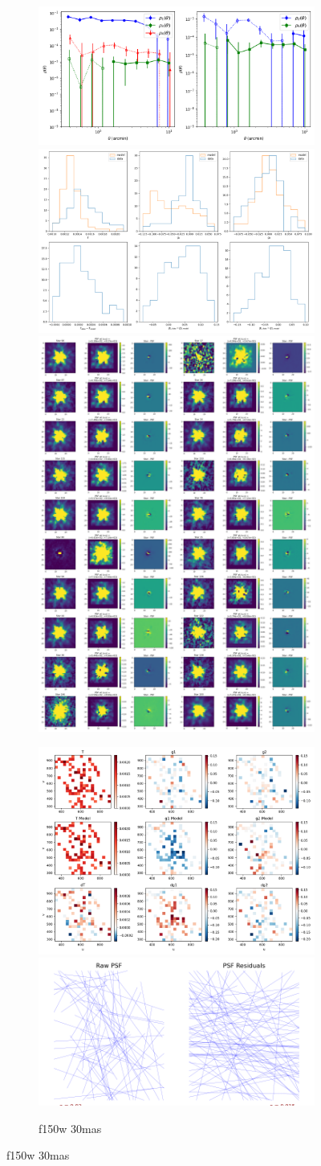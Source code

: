 \documentclass[a4 paper]{article}
\numberwithin{equation}{section}
\newcommand{\0}{\mathbf{0}}
\begin{document}
\begin{figure}[!h]
  \begin{subfigure}{\linewidth}
  \includegraphics[width=.3\linewidth]{115_30/piff_rho.png}\hfill
  \includegraphics[width=.3\linewidth]{115_30/piff_shapes.png}\hfill
  \includegraphics[width=.3\linewidth]{115_30/piff_stars.png}
  \end{subfigure}\par\medskip
  \begin{subfigure}{\linewidth}
  \includegraphics[width=.3\linewidth]{115_30/piff_twod.png}\hfill
  \includegraphics[width=.3\linewidth]{115_30/piff_whisker.png}\hfill
  \caption{f150w 30mas}
  \end{subfigure}\par\medskip


\end{figure}
\end{document}

